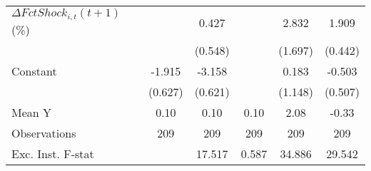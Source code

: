 {\begin{tabular}{l*{5}{c}}
\addlinespace
$ \Delta FctShock_{i,t}(t+1)$ (\%)&                     &       0.427         &                     &       2.832         &       1.909\sym{***}\\
                    &                     &     (0.548)         &                     &     (1.697)         &     (0.442)         \\
\addlinespace
Constant            &      -1.915\sym{**} &      -3.158\sym{***}&                     &       0.183         &      -0.503         \\
                    &     (0.627)         &     (0.621)         &                     &     (1.148)         &     (0.507)         \\
\midrule
Mean Y              &        0.10         &        0.10         &        0.10         &        2.08         &       -0.33         \\
Observations        &         209         &         209         &         209         &         209         &         209         \\
Exc. Inst. F-stat   &                     &      17.517         &       0.587         &      34.886         &      29.542         \\
\bottomrule
\end{tabular}
}
